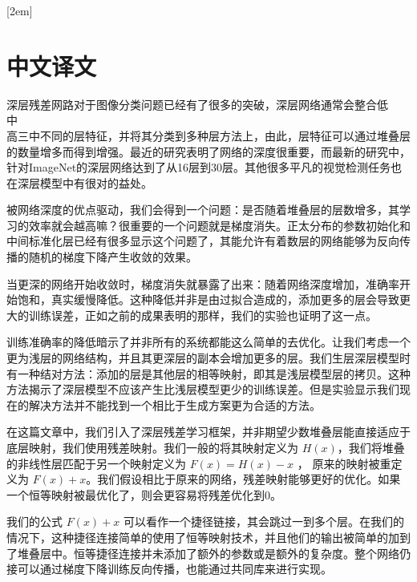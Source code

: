 
[2em]{\vspace{.5\baselineskip}\xiaosan\song}
             {\prechaptername\CJKnumber{\thecontentslabel}\postchaptername\qquad}{}
             {}             %
\setcounter{page}{1}            %
\chapter*{中文译文}



深层残差网路对于图像分类问题已经有了很多的突破，深层网络通常会整合低\\中\\高三中不同的层特征，并将其分类到多种层方法上，由此，层特征可以通过堆叠层的数量增多而得到增强。最近的研究表明了网络的深度很重要，而最新的研究中，针对ImageNet的深层网络达到了从16层到30层。其他很多平凡的视觉检测任务也在深层模型中有很对的益处。

被网络深度的优点驱动，我们会得到一个问题：是否随着堆叠层的层数增多，其学习的效率就会越高嘛？很重要的一个问题就是梯度消失。正太分布的参数初始化和中间标准化层已经有很多显示这个问题了，其能允许有着数层的网络能够为反向传播的随机的梯度下降产生收敛的效果。

当更深的网络开始收敛时，梯度消失就暴露了出来：随着网络深度增加，准确率开始饱和，真实缓慢降低。这种降低并非是由过拟合造成的，添加更多的层会导致更大的训练误差，正如之前的成果表明的那样，我们的实验也证明了这一点。

训练准确率的降低暗示了并非所有的系统都能这么简单的去优化。让我们考虑一个更为浅层的网络结构，并且其更深层的副本会增加更多的层。我们生层深层模型时有一种结对方法：添加的层是其他层的相等映射，即其是浅层模型层的拷贝。这种方法揭示了深层模型不应该产生比浅层模型更少的训练误差。但是实验显示我们现在的解决方法并不能找到一个相比于生成方案更为合适的方法。

在这篇文章中，我们引入了深层残差学习框架，并非期望少数堆叠层能直接适应于底层映射，我们使用残差映射。我们一般的将其映射定义为 $ H(x) $，我们将堆叠的非线性层匹配于另一个映射定义为 $ F(x) = H(x) -x $ ， 原来的映射被重定义为 $ F(x)+x $。我们假设相比于原来的网络，残差映射能够更好的优化。如果一个恒等映射被最优化了，则会更容易将残差优化到0。

我们的公式 $ F(x)+x $ 可以看作一个捷径链接，其会跳过一到多个层。在我们的情况下，这种捷径连接简单的使用了恒等映射技术，并且他们的输出被简单的加到了堆叠层中。恒等捷径连接并未添加了额外的参数或是额外的复杂度。整个网络仍接可以通过梯度下降训练反向传播，也能通过共同库来进行实现。

